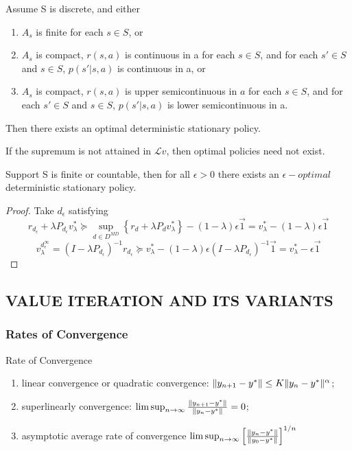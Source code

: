 \begin{theorem}
    Assume S is discrete, and either
    \begin{enumerate}
        \item $ A_s $ is finite for each $ s \in S $, or
        \item $ A_s $ is compact, $ r(s,a) $ is continuous in a for each $ s \in S $, and for each $ s' \in S $ and $ s \in S $, $ p(s' | s, a) $ is continuous in a, or
        \item $ A_s $ is compact, $ r(s, a) $ is upper semicontinuous in $ a $ for each $ s \in S $, and for each $ s' \in S $ and $ s \in S $, $ p(s' | s, a) $ is lower semicontinuous in a.
    \end{enumerate}
    Then there exists an optimal deterministic stationary policy.
\end{theorem}

If the supremum is not attained in $ \mathcal{L}v $, then optimal policies need not exist.
\begin{theorem}
    Support S is finite or countable, then for all $ \epsilon > 0 $ there exists an $ \epsilon-optimal $deterministic stationary policy.
    \begin{proof}
        Take $ d_{\epsilon} $ satisfying
        \[
            r_{d_{\epsilon}} + \lambda P_{d_{\epsilon}} v^*_{\lambda} \succeq \sup _{d \in D^{MD}} \left\{ r_d + \lambda P_d v^*_{\lambda} \right\} - (1-\lambda)\epsilon \vec{1} = v^*_{\lambda} - (1-\lambda) \epsilon \vec{1}
        \]
        \[
            v^{d^{\infty}_{\epsilon}}_{\lambda} = {(I - \lambda P_{d_{\epsilon}})}^{-1}r_{d_{\epsilon}} \succeq v^*_{\lambda} - (1-\lambda)\epsilon{(I - \lambda P_{d_{\epsilon}})}^{-1} \vec{1} = v^*_{\lambda} - \epsilon \vec{1}
        \]
    \end{proof}
\end{theorem}

\subsection{VALUE ITERATION AND ITS VARIANTS}%
\label{sub:value_iteration_and_its_variants}

\subsubsection{Rates of Convergence}%

Rate of Convergence
\begin{enumerate}
    \item linear convergence or quadratic convergence: $ \Arrowvert y_{n+1} - y^* \Arrowvert \le K \Arrowvert y_n - y^* \Arrowvert^\alpha$;
    \item superlinearly convergence: $ \limsup_{n \rightarrow \infty} \frac{ \Arrowvert y_{n+1} - y^* \Arrowvert}{ \Arrowvert y_n - y^* \Arrowvert} = 0 $;
    \item asymptotic average rate of convergence $ \limsup_{n \rightarrow \infty} {\left[ \frac{\Arrowvert y_n - y^* \Arrowvert}{\Arrowvert y_0 - y^* \Arrowvert}  \right]}^{1/n} $
\end{enumerate}

